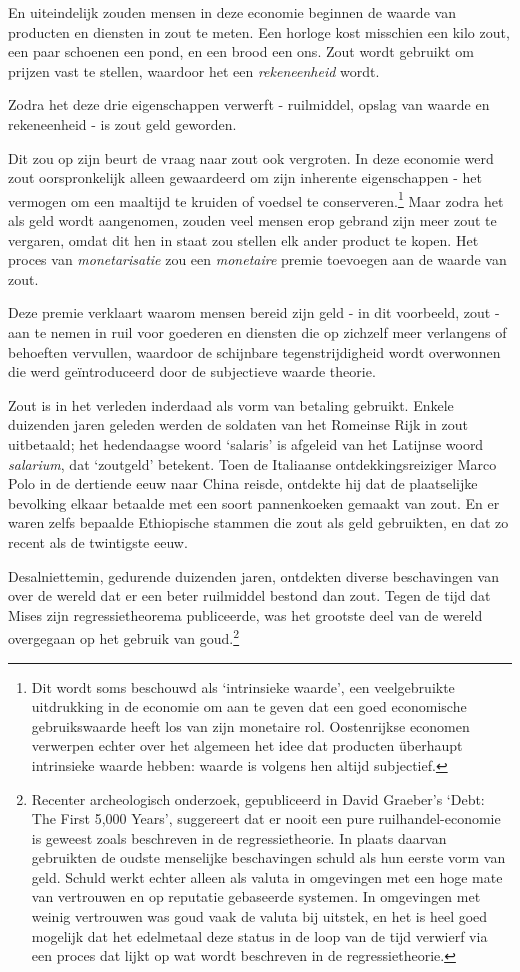 \documentclass[smalldemyvopaper,11pt,twoside,onecolumn,openright,extrafontsizes,hidelinks]{memoir}
\begin{document}
En uiteindelijk zouden mensen in deze economie beginnen de waarde van
producten en diensten in zout te meten. Een horloge kost misschien een
kilo zout, een paar schoenen een pond, en een brood een ons. Zout wordt
gebruikt om prijzen vast te stellen, waardoor het een
\emph{rekeneenheid} wordt.

Zodra het deze drie eigenschappen verwerft - ruilmiddel, opslag van
waarde en rekeneenheid - is zout geld geworden.

Dit zou op zijn beurt de vraag naar zout ook vergroten. In deze economie
werd zout oorspronkelijk alleen gewaardeerd om zijn inherente
eigenschappen - het vermogen om een maaltijd te kruiden of voedsel te
conserveren.\footnote{Dit wordt soms beschouwd als `intrinsieke waarde',
  een veelgebruikte uitdrukking in de economie om aan te geven dat een
  goed economische gebruikswaarde heeft los van zijn monetaire rol.
  Oostenrijkse economen verwerpen echter over het algemeen het idee dat
  producten überhaupt intrinsieke waarde hebben: waarde is volgens hen
  altijd subjectief.} Maar zodra het als geld wordt aangenomen, zouden
veel mensen erop gebrand zijn meer zout te vergaren, omdat dit hen in
staat zou stellen elk ander product te kopen. Het proces van
\emph{monetarisatie} zou een \emph{monetaire} premie toevoegen aan de
waarde van zout.

Deze premie verklaart waarom mensen bereid zijn geld - in dit voorbeeld,
zout - aan te nemen in ruil voor goederen en diensten die op zichzelf
meer verlangens of behoeften vervullen, waardoor de schijnbare
tegenstrijdigheid wordt overwonnen die werd geïntroduceerd door de
subjectieve waarde theorie.

Zout is in het verleden inderdaad als vorm van betaling gebruikt. Enkele
duizenden jaren geleden werden de soldaten van het Romeinse Rijk in zout
uitbetaald; het hedendaagse woord `salaris' is afgeleid van het Latijnse
woord \emph{salarium}, dat `zoutgeld' betekent. Toen de Italiaanse
ontdekkingsreiziger Marco Polo in de dertiende eeuw naar China reisde,
ontdekte hij dat de plaatselijke bevolking elkaar betaalde met een soort
pannenkoeken gemaakt van zout. En er waren zelfs bepaalde Ethiopische
stammen die zout als geld gebruikten, en dat zo recent als de twintigste
eeuw.

Desalniettemin, gedurende duizenden jaren, ontdekten diverse
beschavingen van over de wereld dat er een beter ruilmiddel bestond dan
zout. Tegen de tijd dat Mises zijn regressietheorema publiceerde, was
het grootste deel van de wereld overgegaan op het gebruik van
goud.\footnote{Recenter archeologisch onderzoek, gepubliceerd in David
  Graeber's `Debt: The First 5,000 Years', suggereert dat er nooit een
  pure ruilhandel-economie is geweest zoals beschreven in de
  regressietheorie. In plaats daarvan gebruikten de oudste menselijke
  beschavingen schuld als hun eerste vorm van geld. Schuld werkt echter
  alleen als valuta in omgevingen met een hoge mate van vertrouwen en op
  reputatie gebaseerde systemen. In omgevingen met weinig vertrouwen was
  goud vaak de valuta bij uitstek, en het is heel goed mogelijk dat het
  edelmetaal deze status in de loop van de tijd verwierf via een proces
  dat lijkt op wat wordt beschreven in de regressietheorie.}
\end{document}
